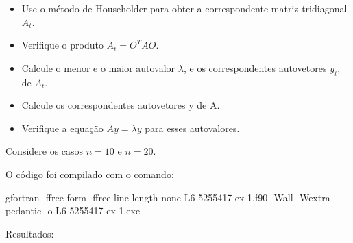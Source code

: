\documentclass[12pt, a4paper]{article} %
\begin{document}
        \begin{itemize}
            \item Use o método de Householder para obter a correspondente matriz tridiagonal $A_{t}$.
        
            \item Verifique o produto $A_{t} = O^{T}AO$.
        
            \item Calcule o menor e o maior autovalor $\lambda$, e os correspondentes autovetores $y_{t}$, de $A_{t}$.
        
            \item Calcule os correspondentes autovetores y de A.
        
            \item Verifique a equação $Ay = \lambda y$ para esses autovalores.
        
        \end{itemize}
        
        Considere os casos $n=10$ e $n=20$.
        
        O c\'odigo foi compilado com o comando:

gfortran -ffree-form -ffree-line-length-none L6-5255417-ex-1.f90 -Wall -Wextra -pedantic -o L6-5255417-ex-1.exe

        Resultados:
\end{document}
